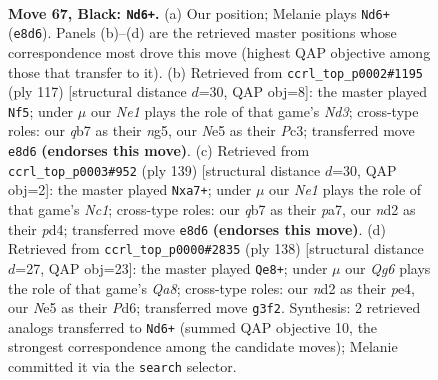 \documentclass[11pt]{article}
\begin{document}
\clearpage

\begin{figure}[p]\centering
\begin{subfigure}{0.46\textwidth}\centering
\resizebox{\linewidth}{!}{%
\newchessgame
\chessboard[
  setfen={3kn3/1Q6/P7/4nK2/8/6q1/3N4/8 b - - 6 67},
  showmover=false,
  pgfstyle=straightmove, color=movearrow, markmove={e8-d6}
]}
\caption{}
\end{subfigure}\hfill
\begin{subfigure}{0.46\textwidth}\centering
\resizebox{\linewidth}{!}{%
\newchessgame
\chessboard[
  setfen={8/8/3n4/3k2N1/8/2pK2PP/8/8 b - - 1 59},
  showmover=false,
  pgfstyle=straightmove, color=movearrow, markmove={d6-f5}
]}
\caption{}
\end{subfigure}
\\[4pt]
\begin{subfigure}{0.46\textwidth}\centering
\resizebox{\linewidth}{!}{%
\newchessgame
\chessboard[
  setfen={2n5/P2k4/8/1K6/3Pn3/8/6N1/8 b - - 0 70},
  showmover=false,
  pgfstyle=straightmove, color=movearrow, markmove={c8-a7}
]}
\caption{}
\end{subfigure}\hfill
\begin{subfigure}{0.46\textwidth}\centering
\resizebox{\linewidth}{!}{%
\newchessgame
\chessboard[
  setfen={Q7/6p1/3P3q/3Nk3/4p1K1/8/8/8 w - - 0 70},
  showmover=false,
  pgfstyle=straightmove, color=movearrow, markmove={a8-e8}
]}
\caption{}
\end{subfigure}
\caption{\textbf{Move 67, Black: \texttt{Nd6+}.} (a) Our position; Melanie plays \texttt{Nd6+} (\texttt{e8d6}). Panels (b)--(d) are the retrieved master positions whose correspondence most drove this move (highest QAP objective among those that transfer to it). (b) Retrieved from \texttt{ccrl\_top\_p0002\#1195} (ply 117) [structural distance $d$=30, QAP obj=8]: the master played \texttt{Nf5}; under $\mu$ our \emph{Ne1} plays the role of that game's \emph{Nd3}; cross-type roles: our \emph{q}b7 as their \emph{n}g5, our \emph{N}e5 as their \emph{P}c3; transferred move \texttt{e8d6} \textbf{(endorses this move)}. (c) Retrieved from \texttt{ccrl\_top\_p0003\#952} (ply 139) [structural distance $d$=30, QAP obj=2]: the master played \texttt{Nxa7+}; under $\mu$ our \emph{Ne1} plays the role of that game's \emph{Nc1}; cross-type roles: our \emph{q}b7 as their \emph{p}a7, our \emph{n}d2 as their \emph{p}d4; transferred move \texttt{e8d6} \textbf{(endorses this move)}. (d) Retrieved from \texttt{ccrl\_top\_p0000\#2835} (ply 138) [structural distance $d$=27, QAP obj=23]: the master played \texttt{Qe8+}; under $\mu$ our \emph{Qg6} plays the role of that game's \emph{Qa8}; cross-type roles: our \emph{n}d2 as their \emph{p}e4, our \emph{N}e5 as their \emph{P}d6; transferred move \texttt{g3f2}. Synthesis: 2 retrieved analogs transferred to \texttt{Nd6+} (summed QAP objective 10, the strongest correspondence among the candidate moves); Melanie committed it via the \texttt{search} selector.}
\label{fig:thought-m133}
\end{figure}
\end{document}
